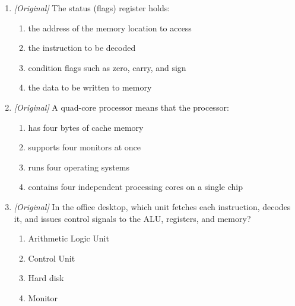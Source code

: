 \documentclass[11pt]{article}
\begin{document}
\begin{enumerate}[label=\textbf{Q\arabic*.}, leftmargin=*]
\begin{enumerate}[label=\Alph*.]
  \end{enumerate}
\item \textit{[Original]} The status (flags) register holds:
  \begin{enumerate}[label=\Alph*.]
    \item the address of the memory location to access
    \item the instruction to be decoded
    \item condition flags such as zero, carry, and sign
    \item the data to be written to memory
  \end{enumerate}
\item \textit{[Original]} A quad-core processor means that the processor:
  \begin{enumerate}[label=\Alph*.]
    \item has four bytes of cache memory
    \item supports four monitors at once
    \item runs four operating systems
    \item contains four independent processing cores on a single chip
  \end{enumerate}
\item \textit{[Original]} In the office desktop, which unit fetches each
  instruction, decodes it, and issues control signals to the ALU, registers,
  and memory?
  \begin{enumerate}[label=\Alph*.]
    \item Arithmetic Logic Unit
    \item Control Unit
    \item Hard disk
    \item Monitor
  \end{enumerate}


\end{enumerate}
\end{document}
